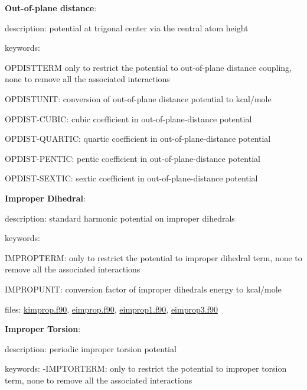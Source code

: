 \begin{DoxyItemize}
\item {\bfseries Out-\/of-\/plane distance}\-:
\begin{DoxyItemize}
\item description\-: potential at trigonal center via the central atom height
\item keywords\-:
\begin{DoxyItemize}
\item O\-P\-D\-I\-S\-T\-T\-E\-R\-M only to restrict the potential to out-\/of-\/plane distance coupling, none to remove all the associated interactions
\item O\-P\-D\-I\-S\-T\-U\-N\-I\-T\-: conversion of out-\/of-\/plane distance potential to kcal/mole
\item O\-P\-D\-I\-S\-T-\/\-C\-U\-B\-I\-C\-: cubic coefficient in out-\/of-\/plane-\/distance potential
\item O\-P\-D\-I\-S\-T-\/\-Q\-U\-A\-R\-T\-I\-C\-: quartic coefficient in out-\/of-\/plane-\/distance potential
\item O\-P\-D\-I\-S\-T-\/\-P\-E\-N\-T\-I\-C\-: pentic coefficient in out-\/of-\/plane-\/distance potential
\item O\-P\-D\-I\-S\-T-\/\-S\-E\-X\-T\-I\-C\-: sextic coefficient in out-\/of-\/plane-\/distance potential
\end{DoxyItemize}
\end{DoxyItemize}
\item {\bfseries Improper Dihedral}\-:
\begin{DoxyItemize}
\item description\-: standard harmonic potential on improper dihedrals
\item keywords\-:
\begin{DoxyItemize}
\item I\-M\-P\-R\-O\-P\-T\-E\-R\-M\-: only to restrict the potential to improper dihedral term, none to remove all the associated interactions
\item I\-M\-P\-R\-O\-P\-U\-N\-I\-T\-: conversion factor of improper dihedrals energy to kcal/mole
\end{DoxyItemize}
\item files\-: \hyperlink{kimprop_8f90}{kimprop.\-f90}, \hyperlink{eimprop_8f90}{eimprop.\-f90}, \hyperlink{eimprop1_8f90}{eimprop1.\-f90}, \hyperlink{eimprop3_8f90}{eimprop3.\-f90}
\end{DoxyItemize}
\item {\bfseries Improper Torsion}\-:
\begin{DoxyItemize}
\item description\-: periodic improper torsion potential
\item keywords\-: -\/\-I\-M\-P\-T\-O\-R\-T\-E\-R\-M\-: only to restrict the potential to improper torsion term, none to remove all the associated interactions


\end{DoxyItemize}
\end{DoxyItemize}
